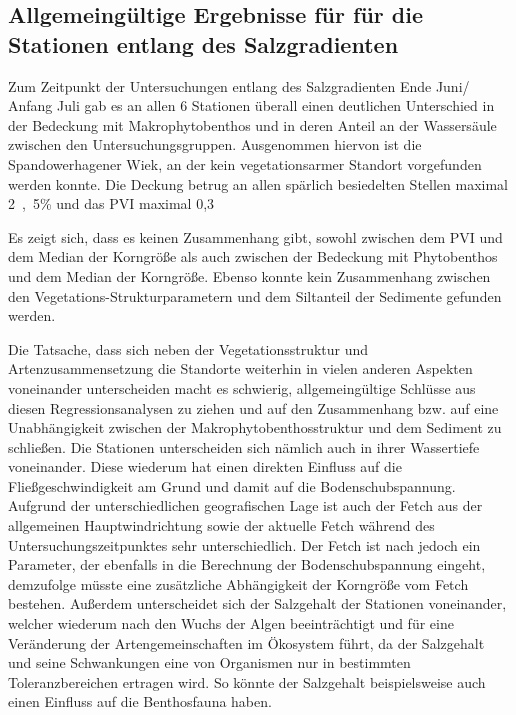 \subsection{Allgemeingültige Ergebnisse für für die Stationen entlang des Salzgradienten}

Zum Zeitpunkt der Untersuchungen entlang des Salzgradienten Ende Juni/ Anfang Juli gab es an allen 6 Stationen überall einen deutlichen Unterschied in der Bedeckung mit Makrophytobenthos und in deren Anteil an der Wassersäule zwischen den Untersuchungsgruppen. Ausgenommen hiervon ist die Spandowerhagener Wiek, an der kein vegetationsarmer Standort vorgefunden werden konnte. Die Deckung betrug an allen spärlich besiedelten Stellen maximal \unit{2,5}{\%} und das PVI maximal 0,3%

Es zeigt sich, dass es keinen Zusammenhang gibt, sowohl zwischen dem PVI und dem Median der Korngröße als auch zwischen der Bedeckung mit Phytobenthos und dem Median der Korngröße. Ebenso konnte kein Zusammenhang zwischen den Vegetations-Strukturparametern und dem Siltanteil der Sedimente gefunden werden.

Die Tatsache, dass sich neben der Vegetationsstruktur und Artenzusammensetzung die Standorte weiterhin in vielen anderen Aspekten voneinander unterscheiden macht es schwierig, allgemeingültige Schlüsse aus diesen Regressionsanalysen zu ziehen und auf den Zusammenhang bzw. auf eine Unabhängigkeit zwischen der Makrophytobenthosstruktur und dem Sediment zu schließen. Die Stationen unterscheiden sich nämlich auch in ihrer Wassertiefe voneinander. Diese wiederum hat einen direkten Einfluss auf die Fließgeschwindigkeit am Grund und damit auf die Bodenschubspannung. Aufgrund der unterschiedlichen geografischen Lage ist auch der Fetch aus der allgemeinen Hauptwindrichtung sowie der aktuelle Fetch während des Untersuchungszeitpunktes sehr unterschiedlich. Der Fetch ist nach \cite{laenen_1996} jedoch ein Parameter, der ebenfalls in die Berechnung der Bodenschubspannung eingeht, demzufolge müsste eine zusätzliche Abhängigkeit der Korngröße vom Fetch bestehen. Außerdem unterscheidet sich der Salzgehalt der Stationen voneinander, welcher wiederum nach \cite{schwenke_1995}  den Wuchs der Algen beeinträchtigt und für eine Veränderung der Artengemeinschaften im Ökosystem führt, da der Salzgehalt und seine Schwankungen eine von Organismen nur in bestimmten Toleranzbereichen ertragen wird. So könnte der Salzgehalt beispielsweise auch einen Einfluss auf die Benthosfauna haben.


